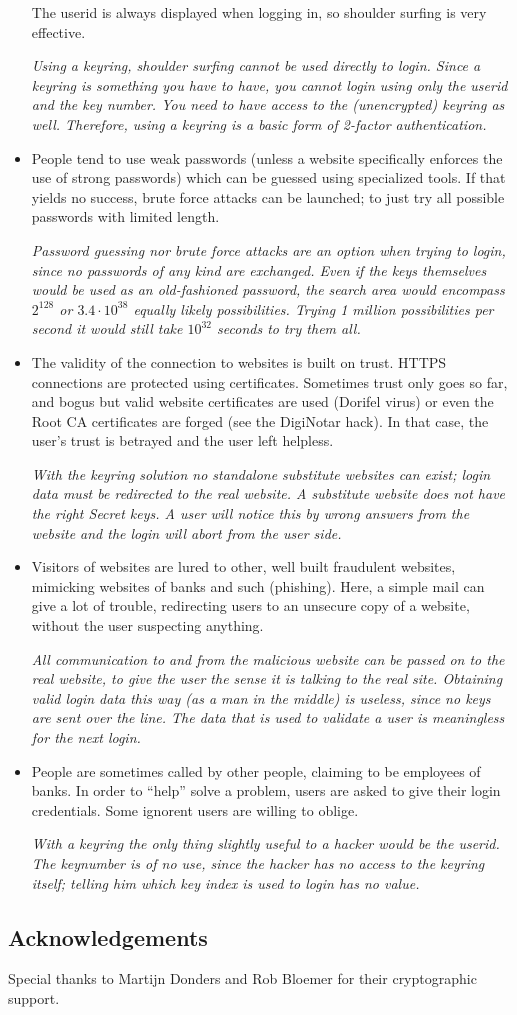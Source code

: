 \begin{itemize}
The userid is always displayed when logging in, so shoulder surfing is very effective.
\par
\emph{Using a keyring, shoulder surfing cannot be used directly to login.
Since a keyring is something you have to have, you cannot login using only the userid and the key number.
You need to have access to the (unencrypted) keyring as well.
Therefore, using a keyring is a basic form of 2-factor authentication.}
\item People tend to use weak passwords (unless a website specifically enforces the use of strong passwords) which can be guessed using specialized tools.
If that yields no success, brute force attacks can be launched; to just try all possible passwords with limited length.
\par
\emph{Password guessing nor brute force attacks are an option when trying to login, since no passwords of any kind are exchanged.
Even if the keys themselves would be used as an old-fashioned password, the search area would encompass $2^{128}$ or $3.4\cdot 10^{38}$ equally likely possibilities.
Trying 1 million possibilities per second it would still take $10^{32}$ seconds to try them all.}
\item The validity of the connection to websites is built on trust.
HTTPS connections are protected using certificates.
Sometimes trust only goes so far, and bogus but valid website certificates are used (Dorifel virus) or even the Root CA certificates are forged (see the DigiNotar hack).
In that case, the user's trust is betrayed and the user left helpless.
\par
\emph{With the keyring solution no standalone substitute websites can exist; login data must be redirected to the real website.
A substitute website does not have the right Secret keys.
A user will notice this by wrong answers from the website and the login will abort from the user side.}
\item Visitors of websites are lured to other, well built fraudulent websites, mimicking websites of banks and such (phishing).
Here, a simple mail can give a lot of trouble, redirecting users to an unsecure copy of a website, without the user suspecting anything.
\par
\emph{All communication to and from the malicious website can be passed on to the real website, to give the user the sense it is talking to the real site.
Obtaining valid login data this way (as a man in the middle) is useless, since no keys are sent over the line.
The data that is used to validate a user is meaningless for the next login.}
\item People are sometimes called by other people, claiming to be employees of banks.
In order to ``help'' solve a problem, users are asked to give their login credentials.
Some ignorent users are willing to oblige.
\par
\emph{With a keyring the only thing slightly useful to a hacker would be the userid.
The keynumber is of no use,
since the hacker has no access to the keyring itself;
telling him which key index is used to login has no value.}
\end{itemize}

\subsection{Acknowledgements}
Special thanks to Martijn Donders and Rob Bloemer for their cryptographic support.
